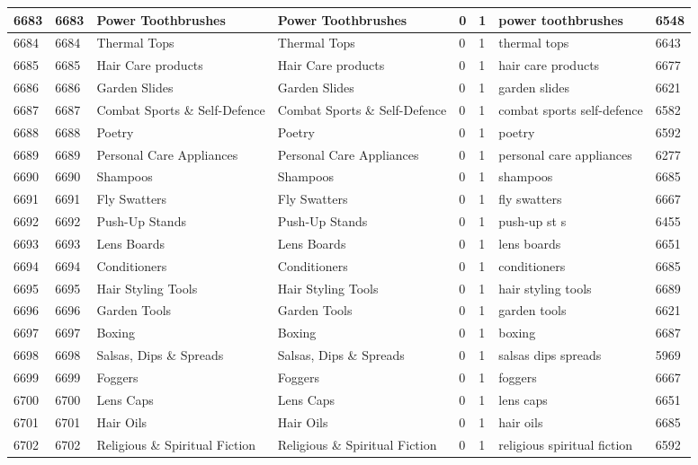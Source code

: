 \begin{longtable}{|l|l|l|l|l|l|l|l|}
6683 & 6683 & Power Toothbrushes & Power Toothbrushes & 0 & 1 & power toothbrushes & 6548 \\ \hline 
6684 & 6684 & Thermal Tops & Thermal Tops & 0 & 1 & thermal tops & 6643 \\ \hline 
6685 & 6685 & Hair Care products & Hair Care products & 0 & 1 & hair care products & 6677 \\ \hline 
6686 & 6686 & Garden Slides & Garden Slides & 0 & 1 & garden slides & 6621 \\ \hline 
6687 & 6687 & Combat Sports \& Self-Defence & Combat Sports \& Self-Defence & 0 & 1 & combat sports self-defence & 6582 \\ \hline 
6688 & 6688 & Poetry & Poetry & 0 & 1 & poetry & 6592 \\ \hline 
6689 & 6689 & Personal Care Appliances & Personal Care Appliances & 0 & 1 & personal care appliances & 6277 \\ \hline 
6690 & 6690 & Shampoos & Shampoos & 0 & 1 & shampoos & 6685 \\ \hline 
6691 & 6691 & Fly Swatters & Fly Swatters & 0 & 1 & fly swatters & 6667 \\ \hline 
6692 & 6692 & Push-Up Stands & Push-Up Stands & 0 & 1 & push-up st s & 6455 \\ \hline 
6693 & 6693 & Lens Boards & Lens Boards & 0 & 1 & lens boards & 6651 \\ \hline 
6694 & 6694 & Conditioners & Conditioners & 0 & 1 & conditioners & 6685 \\ \hline 
6695 & 6695 & Hair Styling Tools & Hair Styling Tools & 0 & 1 & hair styling tools & 6689 \\ \hline 
6696 & 6696 & Garden Tools & Garden Tools & 0 & 1 & garden tools & 6621 \\ \hline 
6697 & 6697 & Boxing & Boxing & 0 & 1 & boxing & 6687 \\ \hline 
6698 & 6698 & Salsas, Dips \& Spreads & Salsas, Dips \& Spreads & 0 & 1 & salsas dips spreads & 5969 \\ \hline 
6699 & 6699 & Foggers & Foggers & 0 & 1 & foggers & 6667 \\ \hline 
6700 & 6700 & Lens Caps & Lens Caps & 0 & 1 & lens caps & 6651 \\ \hline 
6701 & 6701 & Hair Oils & Hair Oils & 0 & 1 & hair oils & 6685 \\ \hline 
6702 & 6702 & Religious \& Spiritual Fiction & Religious \& Spiritual Fiction & 0 & 1 & religious spiritual fiction & 6592 \\ \hline 

\end{longtable}
